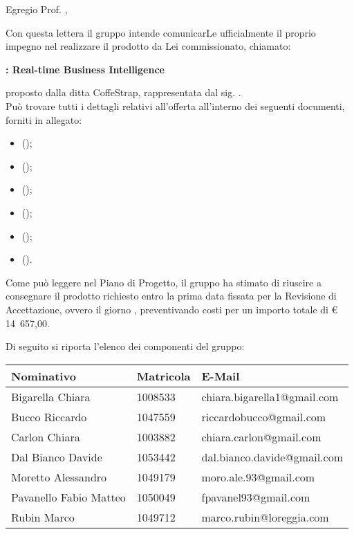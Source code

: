 \documentclass{letter}
\begin{document}
\begin{letter}{}

	\vspace{4cm}
	
	\opening{Egregio Prof. \committente{},}
	
	Con questa lettera il gruppo \groupname{} intende comunicarLe ufficialmente il proprio impegno nel realizzare il prodotto da Lei commissionato, chiamato:
	\begin{center}
		\textbf{\projectname{}: Real-time Business Intelligence}
	\end{center}
	proposto dalla ditta CoffeStrap, rappresentata dal sig. \proponente{}.\\
	Può trovare tutti i dettagli relativi all'offerta all'interno dei seguenti documenti, forniti in allegato:

	\begin{itemize}
		\item {} ();
		\item {} ();
		\item {} ();
		\item {} ();
		\item {} ();
		\item {} ().
	\end{itemize}
	Come può leggere nel Piano di Progetto, il gruppo ha stimato di riuscire a consegnare il prodotto richiesto entro la prima data fissata per la Revisione di Accettazione, ovvero il giorno , preventivando costi per un importo totale di \euro{} 14~657,00.

	Di seguito si riporta l'elenco dei componenti del gruppo:
	\begin{center}
		\begin{tabu}{|p{4cm}|p{2.5cm}|p{5cm}|}
		\hline
			\rowfont{\bf}
			\textbf{Nominativo} & \textbf{Matricola} & \textbf{E-Mail} \\ \hline
			Bigarella Chiara & 1008533 & chiara.bigarella1@gmail.com \\ \hline
			Bucco Riccardo & 1047559 & riccardobucco@gmail.com \\ \hline
			Carlon Chiara & 1003882 & chiara.carlon@gmail.com \\ \hline
			Dal Bianco Davide & 1053442 & dal.bianco.davide@gmail.com \\ \hline
			Moretto Alessandro & 1049179 & moro.ale.93@gmail.com \\ \hline
			Pavanello Fabio Matteo & 1050049 & fpavanel93@gmail.com \\ \hline
			Rubin Marco & 1049712 & marco.rubin@loreggia.com \\ \hline
		\end{tabu}
	\end{center}


\end{letter}
\end{document}

